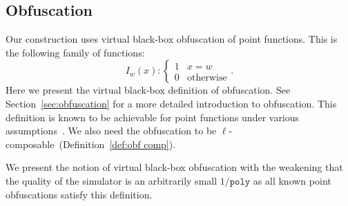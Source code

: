 \documentclass[11pt]{article}
\newcommand{\secref}[1]{\mbox{Section~\ref{#1}}}
\newcommand{\apref}[1]{\mbox{Appendix~\ref{#1}}}
\newcommand{\defref}[1]{\mbox{Definition~\ref{#1}}}
\newcommand{\class}[1]{{\ensuremath{\mathsf{#1}}}}
\newcommand{\neigh}{\ensuremath{\class{Neigh}}\xspace}
\newcommand{\poly}{\ensuremath{\mathtt{poly}}\xspace}
\newtheorem{lemma}[theorem]{Lemma}
\newtheorem{definition}[theorem]{Definition}
\newcommand{\authnote}[2]{{\textcolor{red}{\textsf{#1 notes: }\textcolor{blue}{ #2}}\marginpar{\textcolor{red}{\textbf{!!!!!}}}}}
\newcommand{\authnote}[2]{}
\newcommand{\bnote}[1]{{\authnote{Ben}{#1}}}
\begin{document}

%
%
%

\subsection{Obfuscation}
Our construction uses virtual black-box obfuscation of point functions.  This is the following family of functions:
\[
I_w(x):\begin{cases} 1 & x=w\\0 & \text{otherwise}\end{cases}.
\]
Here we present the virtual black-box definition of obfuscation.  See \secref{sec:obfuscation} for a more detailed introduction to obfuscation.  This definition is known to be achievable for point functions under various assumptions~\cite{canetti1997towards, wee2005obfuscating}.  We also need the obfuscation to be $\ell$-composable~(\defref{def:obf comp}).

We present the notion of virtual black-box obfuscation with the weakening that the quality of the simulator is an arbitrarily small $1/\poly$ as all known point obfuscations satisfy this definition.
\end{document}
